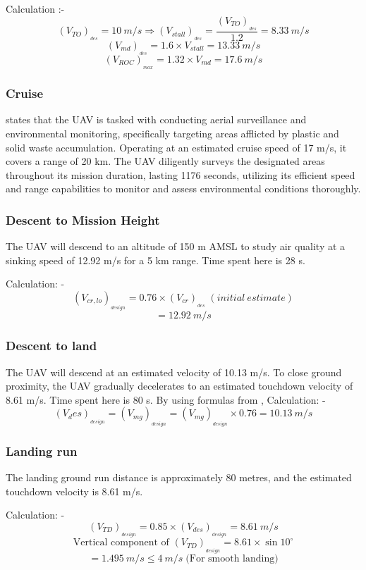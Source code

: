 \documentclass[12 pt]{article}
\begin{document}
Calculation :- 
$$ (V_{TO})_{_{des}} = 10 \: m/s \Rightarrow (V_{stall})_{_{des}} = \frac{(V_{TO})_{_{des}}}{1.2} = 8.33 \: m/s $$
$$ (V_{md})_{_{des}} = 1.6 \times V_{stall} = 13.33 \: m/s $$
$$ (V_{ROC})_{_{max}} = 1.32 \times V_{md} = 17.6 \: m/s $$

\subsubsection{Cruise }
\cite{alhajjaji2017design} states that the UAV is tasked with conducting aerial surveillance and environmental monitoring, specifically targeting areas afflicted by plastic and solid waste accumulation. Operating at an estimated cruise speed of 17 m/s, it covers a range of 20 km. The UAV diligently surveys the designated areas throughout its mission duration, lasting 1176 seconds, utilizing its efficient speed and range capabilities to monitor and assess environmental conditions thoroughly.

\subsubsection{Descent to Mission Height}
The UAV will descend to an altitude of 150 m AMSL to study air quality at a sinking speed of 12.92 m/s for a 5 km range. Time spent here is 28 s.

Calculation: - 
$$(V_{cr,lo})_{_{design}} = 0.76 \times (V_{cr})_{_{des}} \;  (initial \: estimate) $$
$$ = 12.92 \: m/s $$

\subsubsection{Descent to land }
The UAV will descend at an estimated velocity of 10.13 m/s. To close ground proximity, the UAV gradually decelerates to an estimated touchdown velocity of 8.61 m/s. Time spent here is 80 s. By using formulas from \cite{Anderson1},
Calculation: - 
$$(V_des)_{_{design}} = (V_{mg})_{_{design}} = (V_{mg})_{_{design}} \times 0.76 = 10.13 \: m/s $$

\subsubsection{Landing run}
The landing ground run distance is approximately 80 metres, and the estimated touchdown velocity is 8.61 m/s.

Calculation: - 
$$ (V_{TD})_{_{design}} = 0.85 \times (V_{des})_{_{design}} = 8.61 \: m/s  $$
$$ \text{Vertical component of } (V_{TD})_{_{design}} = 8.61 \times \sin{10^{\circ}} $$
$$ = 1.495 \: m/s \leq 4 \: m/s \; \text{(For smooth landing)} $$
\end{document}
